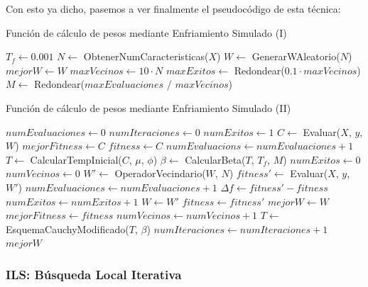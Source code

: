 \documentclass[11pt,a4paper]{article}
\begin{document}
Con esto ya dicho, pasemos a ver finalmente el pseudocódigo de esta técnica:

\begin{algorithm}[H]
\caption{Función de cálculo de pesos mediante Enfriamiento Simulado (I)}
\begin{algorithmic}[1]
\State $T_f \gets 0.001$
\State $N \gets $ ObtenerNumCaracteristicas($X$)
\State $W \gets $ GenerarWAleatorio($N$)
\State $mejorW \gets W$
\State $maxVecinos \gets 10 \cdot N$
\State $maxExitos \gets $ Redondear($0.1 \cdot maxVecinos$)
\State $M \gets $ Redondear($maxEvaluaciones$ / $maxVecinos$)
\end{algorithmic}
\end{algorithm}

\begin{algorithm}[H]
\caption{Función de cálculo de pesos mediante Enfriamiento Simulado (II)}
\begin{algorithmic}
\State $numEvaluaciones \gets 0$
\State $numIteraciones \gets 0$
\State $numExitos \gets 1$
\State $C \gets $ Evaluar($X$, $y$, $W$)
\State $mejorFitness \gets C$
\State $fitness \gets C$
\State $numEvaluacions \gets numEvaluaciones + 1$
\State $T \gets $ CalcularTempInicial($C$, $\mu$, $\phi$)
\State $\beta \gets $ CalcularBeta($T$, $T_f$, $M$)
	\State $numExitos \gets 0$
	\State $numVecinos \gets 0$
		\State $W' \gets $ OperadorVecindario($W$, $N$)
		\State $fitness' \gets $ Evaluar($X$, $y$, $W'$)
		\State $numEvaluaciones \gets numEvaluaciones + 1$
		\State $\Delta f \gets fitness' - fitness$
			\State $numExitos \gets numExitos + 1$
			\State $W \gets W'$
			\State $fitness \gets fitness'$
				\State $mejorW \gets W$
				\State $mejorFitness \gets fitness$
			\EndIf
		\EndIf	
		\State $numVecinos \gets numVecinos + 1$
	\EndWhile
	\State $T \gets$ EsquemaCauchyModificado($T$, $\beta$)
	\State $numIteraciones \gets numIteraciones + 1$	
\EndWhile
\State \Return $mejorW$
\EndFunction
\end{algorithmic}
\end{algorithm}

\newpage

\subsubsection{ILS: Búsqueda Local Iterativa}
\end{document}

